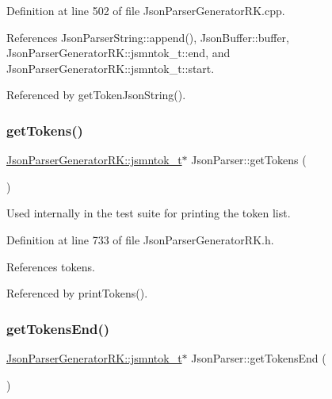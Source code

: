 Definition at line 502 of file Json\+Parser\+Generator\+R\+K.\+cpp.



References Json\+Parser\+String\+::append(), Json\+Buffer\+::buffer, Json\+Parser\+Generator\+R\+K\+::jsmntok\+\_\+t\+::end, and Json\+Parser\+Generator\+R\+K\+::jsmntok\+\_\+t\+::start.



Referenced by get\+Token\+Json\+String().

\mbox{\label{class_json_parser_a1cdeae1e2cf1b45cde47ca8a8f9a84c9}} 
\subsubsection{\texorpdfstring{get\+Tokens()}{getTokens()}}
{\footnotesize\ttfamily \hyperlink{struct_json_parser_generator_r_k_1_1jsmntok__t}{Json\+Parser\+Generator\+R\+K\+::jsmntok\+\_\+t}$\ast$ Json\+Parser\+::get\+Tokens (\begin{DoxyParamCaption}{ }\end{DoxyParamCaption})\hspace{0.3cm}{\ttfamily [inline]}}



Used internally in the test suite for printing the token list. 



Definition at line 733 of file Json\+Parser\+Generator\+R\+K.\+h.



References tokens.



Referenced by print\+Tokens().

\mbox{\label{class_json_parser_a8e0503af76c2bc9b8d2231dddb8b1cb3}} 
\subsubsection{\texorpdfstring{get\+Tokens\+End()}{getTokensEnd()}}
{\footnotesize\ttfamily \hyperlink{struct_json_parser_generator_r_k_1_1jsmntok__t}{Json\+Parser\+Generator\+R\+K\+::jsmntok\+\_\+t}$\ast$ Json\+Parser\+::get\+Tokens\+End (\begin{DoxyParamCaption}{ }\end{DoxyParamCaption})\hspace{0.3cm}{\ttfamily [inline]}}



